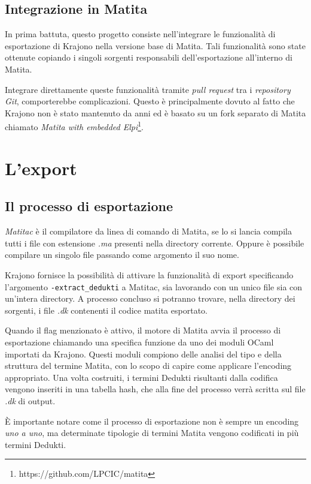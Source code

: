 \documentclass[12pt,a4paper]{mimosis}
\begin{document}
\subsection{Integrazione in Matita}
In prima battuta, questo progetto consiste nell'integrare le funzionalità di 
esportazione di Krajono nella versione base di Matita. Tali funzionalità sono
state ottenute copiando i singoli sorgenti responsabili dell'esportazione 
all'interno di Matita.

Integrare direttamente queste funzionalità tramite \textit{pull request} tra
i \textit{repository Git}, comporterebbe complicazioni. Questo
è principalmente dovuto al fatto che Krajono non è stato mantenuto da anni ed
è basato su un fork separato di Matita chiamato \textit{Matita with embedded
Elpi}\footnote{https://github.com/LPCIC/matita}. 


\section{L'export}
\subsection{Il processo di esportazione}\label{sottosezioneProcessoDiExport}
\textit{Matitac} è il compilatore da linea di comando di Matita, se lo si lancia
compila tutti i file con estensione \textit{.ma} presenti nella directory corrente. 
Oppure è possibile compilare un singolo file passando come argomento il suo
nome.

Krajono fornisce la possibilità di attivare la funzionalità di export specificando l'argomento \texttt{-extract\_dedukti} a Matitac,
sia lavorando con un unico file sia con un'intera directory. A processo concluso 
si potranno trovare, nella directory dei sorgenti, i file \textit{.dk} contenenti
il codice matita esportato.

Quando il flag menzionato è attivo, il motore di Matita avvia il processo di
esportazione chiamando una specifica funzione da uno dei moduli OCaml importati
da Krajono. Questi moduli compiono delle analisi del tipo e della struttura del
termine Matita, con lo scopo di capire come applicare l'encoding appropriato.
Una volta costruiti, i termini Dedukti risultanti dalla codifica vengono inseriti
in una tabella hash, che alla fine del processo verrà scritta sul file \textit{.dk}
di output.

È importante notare come il processo di esportazione non è sempre un encoding
\textit{uno a uno}, ma determinate tipologie di termini Matita vengono codificati
in più termini Dedukti.
\end{document}
